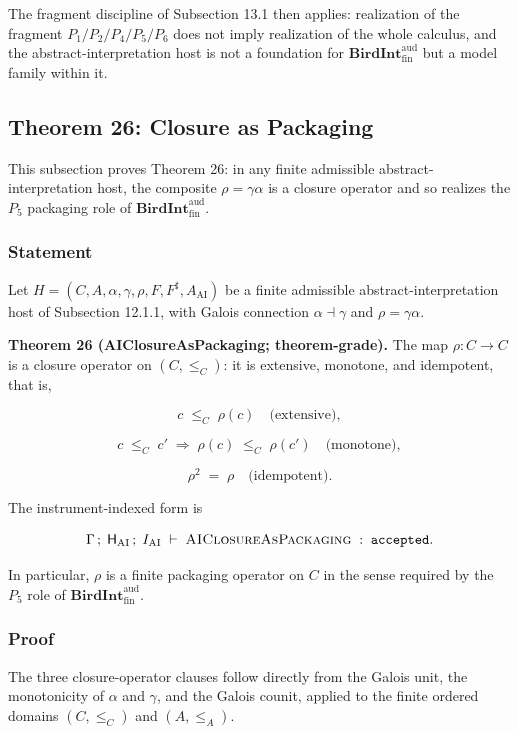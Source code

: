 \documentclass[11pt]{article}
\theoremstyle{definition}
\begin{document}
The fragment discipline of Subsection 13.1 then applies: realization of the fragment \(P_1/P_2/P_4/P_5/P_6\) does not imply realization of the whole calculus, and the abstract-interpretation host is not a foundation for \(\mathbf{BirdInt}^{\mathrm{aud}}_{\mathrm{fin}}\) but a model family within it.

\subsection{Theorem 26: Closure as Packaging}

This subsection proves Theorem 26: in any finite admissible abstract-interpretation host, the composite \(\rho=\gamma\alpha\) is a closure operator and so realizes the \(P_5\) packaging role of \(\mathbf{BirdInt}^{\mathrm{aud}}_{\mathrm{fin}}\).

\subsubsection{Statement}

Let \(H=(C,A,\alpha,\gamma,\rho,F,F^{\sharp},A_{\mathrm{AI}})\) be a finite admissible abstract-interpretation host of Subsection 12.1.1, with Galois connection \(\alpha\dashv\gamma\) and \(\rho=\gamma\alpha\).

\textbf{Theorem 26 (AIClosureAsPackaging; theorem-grade).} The map \(\rho:C\to C\) is a closure operator on \((C,\le_C)\): it is extensive, monotone, and idempotent, that is,

\[
c\;\le_C\;\rho(c)\quad\text{(extensive)},
\]

\[
c\;\le_C\;c'\;\Longrightarrow\;\rho(c)\;\le_C\;\rho(c')\quad\text{(monotone)},
\]

\[
\rho^{2}\;=\;\rho\quad\text{(idempotent)}.
\]

The instrument-indexed form is

\[
\Gamma\,;\;\mathsf H_{\mathrm{AI}}\,;\;I_{\mathrm{AI}}\;\vdash\;\textsc{AIClosureAsPackaging}\;:\;\texttt{accepted}.
\]

In particular, \(\rho\) is a finite packaging operator on \(C\) in the sense required by the \(P_5\) role of \(\mathbf{BirdInt}^{\mathrm{aud}}_{\mathrm{fin}}\).

\subsubsection{Proof}

The three closure-operator clauses follow directly from the Galois unit, the monotonicity of \(\alpha\) and \(\gamma\), and the Galois counit, applied to the finite ordered domains \((C,\le_C)\) and \((A,\le_A)\).
\end{document}
